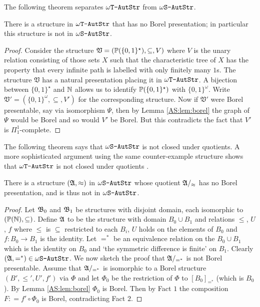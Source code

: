 The following theorem separates $\mbox{\tt $\omega$T-AutStr}$ from $\mbox{\tt $\omega$S-AutStr}$.

\begin{theorem} \label{AS:thm:sep}
There is a structure in $\mbox{\tt $\omega$T-AutStr}$ that has no Borel presentation; in particular this structure is not in $\mbox{\tt $\omega$S-AutStr}$.
\end{theorem}

\begin{proof}
Consider the structure $\mathfrak{V} = ({\mathbb P}(\{0,1\}^\star),\subseteq,V)$ where $V$ is the unary relation consisting of those sets $X$ such that
the characteristic tree of $X$ has the property that every infinite path is labelled with only finitely many $1$s. The structure $\mathfrak{V}$ has a natural presentation placing it in $\mbox{\tt $\omega$T-AutStr}$. A bijection between $\{0,1\}^\star$ and $\mathbb{N}$ allows us to identify ${\mathbb P}(\{0,1\}^\star)$ with $\{0,1\}^\omega$.
Write $\mathfrak{V'} = (\{0,1\}^\omega,\subseteq,V')$ for the corresponding structure. 
Now if $\mathfrak{V'}$ were Borel presentable, say via isomorphism $\Psi$, then by Lemma \ref{AS:lem:borel} the graph of $\Psi$ would be Borel and so would $V'$ be Borel. But this contradicts the fact that $V'$ is $\Pi_1^1$-complete. 
\end{proof}

The following theorem says that $\mbox{\tt $\omega$S-AutStr}$ is not closed under quotients.  A more sophisticated argument using the same counter-example structure shows that $\mbox{\tt $\omega$T-AutStr}$ is not closed under quotients \cite{HKMN08}.


\begin{theorem} \label{AS:thm:borel}
There is a structure $(\mathfrak{A},\approx)$ in $\mbox{\tt $\omega$S-AutStr}$ whose quotient $\mathfrak{A}/_{\approx}$ has no Borel presentation, and is thus not in $\mbox{\tt $\omega$S-AutStr}$.
\end{theorem}

\begin{proof}
Let $\mathfrak{B}_0$ and $\mathfrak{B}_1$ be structures with disjoint domain, each isomorphic to $({\mathbb P}(\mathbb{N}),\subseteq)$.
Define $\mathfrak{A}$ to be the structure with domain $B_0 \cup B_1$ and relations $\leq$, $U$, $f$ where $\leq$ is
$\subseteq$ restricted to each $B_i$, $U$ holds on the elements of $B_0$ and $f:B_0 \to B_1$ is the identity. Let $=^*$ be an equivalence
relation on the $B_0 \cup B_1$ which is the identity on $B_0$ and `the symmetric difference is finite' on $B_1$. Clearly 
$(\mathfrak{A},=^*) \in \mbox{\tt $\omega$S-AutStr}$. We now sketch the proof that $\mathfrak{A}/_{=^*}$ is not Borel presentable. 
Assume that $\mathfrak{A}/_{=^*}$ is isomorphic to a Borel structure $(B',\leq',U',f')$ via $\Phi$ and let $\Phi_0$ be the restriction of 
$\Phi$ to $[B_0]_{=^*}$ (which is $B_0$). By Lemma \ref{AS:lem:borel} $\Phi_0$ is Borel.
Then  by Fact $1$ the composition $F: = f' \circ \Phi_0$ is Borel, contradicting Fact $2$.
\end{proof}

